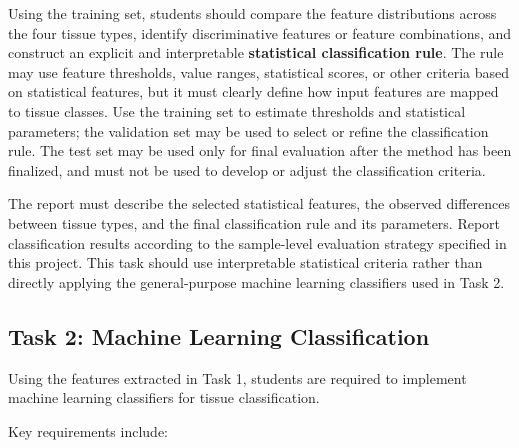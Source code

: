 \documentclass[11pt]{article}
\begin{document}
Using the training set, students should compare the feature distributions across the four tissue types, identify discriminative features or feature combinations, and construct an explicit and interpretable \textbf{statistical classification rule}. The rule may use feature thresholds, value ranges, statistical scores, or other criteria based on statistical features, but it must clearly define how input features are mapped to tissue classes. Use the training set to estimate thresholds and statistical parameters; the validation set may be used to select or refine the classification rule. The test set may be used only for final evaluation after the method has been finalized, and must not be used to develop or adjust the classification criteria.

The report must describe the selected statistical features, the observed differences between tissue types, and the final classification rule and its parameters. Report classification results according to the sample-level evaluation strategy specified in this project. This task should use interpretable statistical criteria rather than directly applying the general-purpose machine learning classifiers used in Task 2.

\subsection{Task 2: Machine Learning Classification}

Using the features extracted in Task 1, students are required to implement machine learning classifiers for tissue classification.

Key requirements include:
\end{document}
